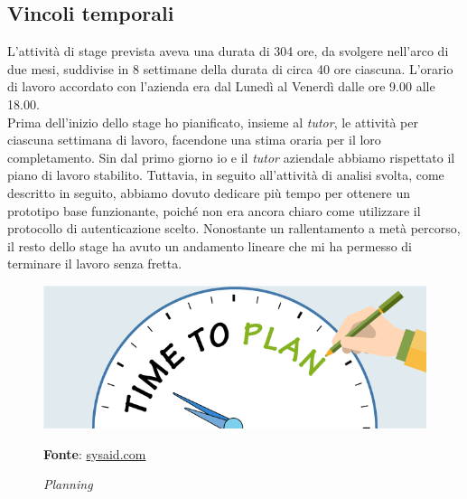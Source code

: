     \subsection{Vincoli temporali}\label{sec:vincoli_tempo}
    L'attività di stage prevista aveva una durata di 304 ore, da svolgere nell'arco di due mesi, suddivise in 8 settimane della durata di circa 40 ore ciascuna. L'orario di lavoro accordato con l'azienda era dal Lunedì al Venerdì dalle ore 9.00 alle 18.00. \\
    Prima dell'inizio dello stage ho pianificato, insieme al \textit{tutor}, le attività per ciascuna settimana di lavoro, facendone una stima oraria per il loro completamento. Sin dal primo giorno io e il \textit{tutor} aziendale abbiamo rispettato il piano di lavoro stabilito. Tuttavia, in seguito all'attività di analisi svolta, come descritto in seguito, abbiamo dovuto dedicare più tempo per ottenere un prototipo base funzionante, poiché non era ancora chiaro come utilizzare il protocollo di autenticazione scelto. Nonostante un rallentamento a metà percorso, il resto dello stage ha avuto un andamento lineare che mi ha permesso di terminare il lavoro senza fretta. 
    
    \begin{figure}[ht]
        \centering
        \includegraphics[width=1\textwidth]{immagini/plan.png}
        \caption{\textit{Planning}}
        \textbf{Fonte}:
        \href{https://www.sysaid.com/blog/entry/8-tips-on-how-to-plan-for-configuration-management-part-1}{sysaid.com}
        \label{fig: Planning}
    \end{figure}
    
